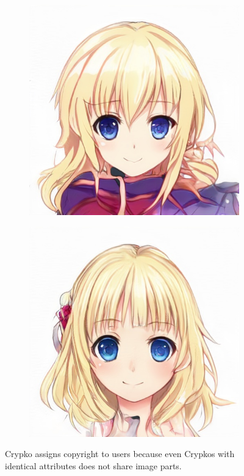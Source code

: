 \documentclass[b5paper]{article}
\begin{document}
\begin{figure}[!h]
\begin{subfigure}{0.5\textwidth}
  \includegraphics[width=\textwidth]{578.jpg}
\end{subfigure}\hspace*{\fill}
\begin{subfigure}{0.5\textwidth}
  \includegraphics[width=\textwidth]{280706.jpg}
\end{subfigure}

\caption{
Crypko assigns copyright to users because even Crypkos with identical attributes does not share image parts.
}
\end{figure}
\end{document}
